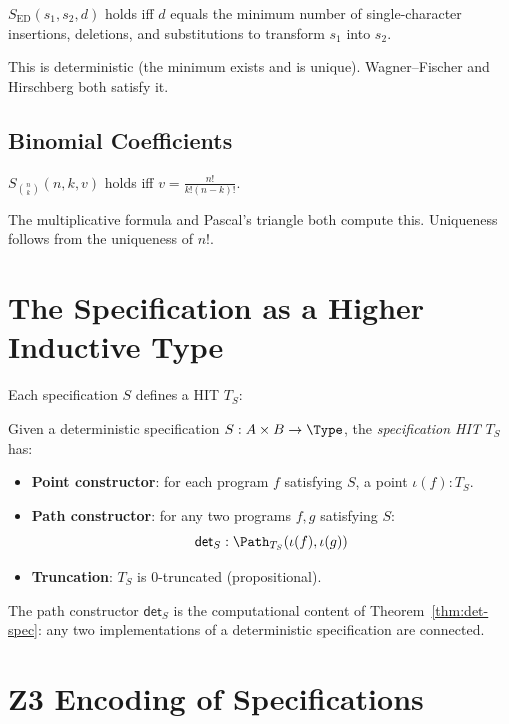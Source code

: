 \begin{definition}
$S_{\mathrm{ED}}(s_1, s_2, d)$ holds iff $d$ equals the minimum
number of single-character insertions, deletions, and substitutions
to transform $s_1$ into $s_2$.
\end{definition}

This is deterministic (the minimum exists and is unique).
Wagner--Fischer and Hirschberg both satisfy it.

\subsection{Binomial Coefficients}

\begin{definition}
$S_{\binom{n}{k}}(n, k, v)$ holds iff $v = \frac{n!}{k!(n-k)!}$.
\end{definition}

The multiplicative formula and Pascal's triangle both compute this.
Uniqueness follows from the uniqueness of $n!$.

\section{The Specification as a Higher Inductive Type}

Each specification $S$ defines a HIT $T_S$:

\begin{definition}
Given a deterministic specification $S : A \times B \to \Type$,
the \emph{specification HIT} $T_S$ has:
\begin{itemize}
  \item \textbf{Point constructor}: for each program $f$ satisfying
    $S$, a point $\iota(f) : T_S$.
  \item \textbf{Path constructor}: for any two programs $f, g$
    satisfying $S$:
    \[
      \mathsf{det}_S : \Path_{T_S}(\iota(f), \iota(g))
    \]
  \item \textbf{Truncation}: $T_S$ is 0-truncated (propositional).
\end{itemize}
\end{definition}

The path constructor $\mathsf{det}_S$ is the computational content
of Theorem~\ref{thm:det-spec}: any two implementations of a
deterministic specification are connected.

\section{Z3 Encoding of Specifications}

